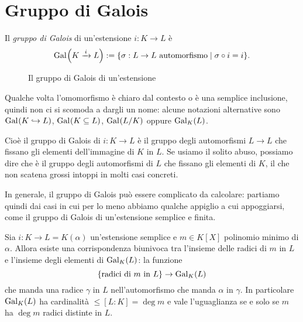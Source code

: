 
\section{Gruppo di Galois}

\begin{defi}
Il {\em gruppo di Galois} di un'estensione \(i : K \to L\) è
\[\Gal{K \mor i L} := \{\sigma : L \to L \text{ automorfismo} \mid \sigma \circ i = i \} .\]
\begin{figure}
\centering
{}
\caption{Il gruppo di Galois di un'estensione}
\end{figure}
Qualche volta l'omomorfismo è chiaro dal contesto o è una semplice inclusione, quindi non ci si scomoda a dargli un nome: alcune notazioni alternative sono \(\Gal{K \hookrightarrow L}\), \(\Gal{K \subseteq L}\), \(\Gal{L/K}\) oppure \(\Gal[K]{L}\).
\end{defi}

Cioè il gruppo di Galois di \(i : K \to L\) è il gruppo degli automorfismi \(L \to L\) che fissano gli elementi dell'immagine di \(K\) in \(L\). Se usiamo il solito abuso, possiamo dire che è il gruppo degli automorfismi di \(L\) che fissano gli elementi di \(K\), il che non scatena grossi intoppi in molti casi concreti.

In generale, il gruppo di Galois può essere complicato da calcolare: partiamo quindi dai casi in cui per lo meno abbiamo qualche appiglio a cui appoggiarsi, come il gruppo di Galois di un'estensione semplice e finita.

\begin{prop}\label{prop:GalEstensioneSempliceFinita}
Sia \(i : K \to L = K(\alpha)\) un'estensione semplice e \(m \in K[X]\) polinomio minimo di \(\alpha\). Allora esiste una corrispondenza biunivoca tra l'insieme delle radici di \(m\) in \(L\) e l'insieme degli elementi di \(\Gal[K]L\): la funzione
\[\{\text{radici di \(m\) in \(L\)}\} \to \Gal[K]L \]
che manda una radice \(\gamma\) in \(L\) nell'automorfismo che manda \(\alpha\) in \(\gamma\). In particolare \(\Gal[K]L\) ha cardinalità \(\le [L:K] = \deg m\) e vale l'uguaglianza se e solo se \(m\) ha \(\deg m\) radici distinte in \(L\).
\end{prop}

